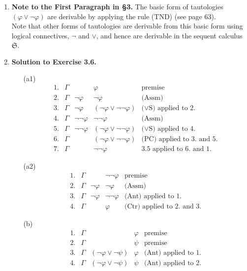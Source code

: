 \begin{enumerate}[1.]
\item \textbf{Note to the First Paragraph in \S3.} The basic form of tautologies $(\varphi \lor \neg \varphi)$ are derivable by applying the rule (TND) (see page 63).\\
Note that other forms of tautologies are derivable from this basic form using logical connectives, $\neg$ and $\lor$, and hence are derivable in the sequent calculus $\mathfrak{S}$.
%
\item \textbf{Solution to Exercise 3.6.}
\begin{itemize}
\item[(a1)]
\[
\begin{array}{lllll}
1. & \Gamma & \, & \varphi & \mbox{premise} \\
2. & \Gamma & \neg \varphi & \neg \varphi & \mbox{(Assm)} \\
3. & \Gamma & \neg \varphi & (\neg \varphi \lor \neg \neg \varphi) & \mbox{($\lor$S) applied to 2.} \\
4. & \Gamma & \neg \neg \varphi & \neg \neg \varphi & \mbox{(Assm)} \\
5. & \Gamma & \neg \neg \varphi & (\neg \varphi \lor \neg \neg \varphi) & \mbox{($\lor$S) applied to 4.} \\
6. & \Gamma & \, & (\neg \varphi \lor \neg \neg \varphi) & \mbox{(PC) applied to 3. and 5.} \\
7. & \Gamma & \, & \neg \neg \varphi & \mbox{3.5 applied to 6. and 1.}
\end{array}
\]
\item[(a2)]
\[
\begin{array}{lllll}
1. & \Gamma & \, & \neg \neg \varphi & \mbox{premise} \\
2. & \Gamma & \neg \varphi & \neg \varphi & \mbox{(Assm)} \\
3. & \Gamma & \neg \varphi & \neg \neg \varphi & \mbox{(Ant) applied to 1.} \\
4. & \Gamma & \, & \varphi & \mbox{(Ctr) applied to 2. and 3.}
\end{array}
\]
\item[(b)]
\[
\begin{array}{lllll}
1. & \Gamma & \, & \varphi & \mbox{premise} \\
2. & \Gamma & \, & \psi & \mbox{premise} \\
3. & \Gamma & (\neg \varphi \lor \neg \psi) & \varphi & \mbox{(Ant) applied to 1.} \\
4. & \Gamma & (\neg \varphi \lor \neg \psi) & \psi & \mbox{(Ant) applied to 2.} \\

\end{array}\]
\end{itemize}
\end{enumerate}
